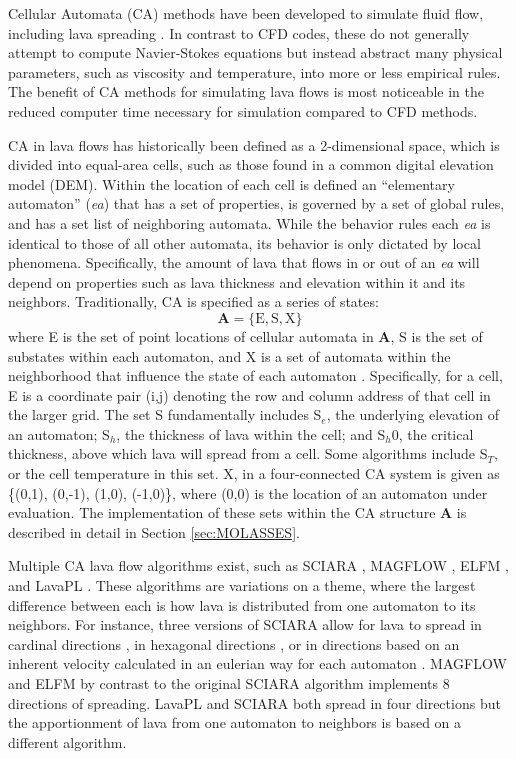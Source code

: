 \documentclass[12pt,letter]{article}
\begin{document}
	Cellular Automata (CA) methods have been developed to simulate fluid flow, including lava spreading \citep{barca1994cellular}. In contrast to CFD codes, these do not generally attempt to compute Navier-Stokes equations but instead abstract many physical parameters, such as viscosity and temperature, into more or less empirical rules. The benefit of CA methods for simulating lava flows is most noticeable in the reduced computer time necessary for simulation compared to CFD methods.

	CA in lava flows has historically been defined as a 2-dimensional space, which is divided into equal-area cells, such as those found in a common digital elevation model (DEM). Within the location of each cell is defined an ``elementary automaton'' (\textit{ea}) that has a set of properties, is governed by a set of global rules, and has a set list of neighboring automata. While the behavior rules each \textit{ea} is identical to those of all other automata, its behavior is only dictated by local phenomena. Specifically, the amount of lava that flows in or out of an \textit{ea} will depend on properties such as lava thickness and elevation within it and its neighbors. Traditionally, CA is specified as a series of states:
	\begin{equation}
		\mathbf{A} = \mathrm{\{E,S,X\}}
	\end{equation}
	where E is the set of point locations of cellular automata in \textbf{A}, S is the set of substates within each automaton, and X is a set of automata within the neighborhood that influence the state of each automaton \citep{barca1994cellular}. Specifically, for a cell, E is a coordinate pair (i,j) denoting the row and column address of that cell in the larger grid. The set S fundamentally includes S$_e$, the underlying elevation of an automaton; S$_h$, the thickness of lava within the cell; and S$_h0$, the critical thickness, above which lava will spread from a cell. Some algorithms include S$_T$, or the cell temperature in this set. X, in a four-connected CA system is given as \{(0,1), (0,-1), (1,0), (-1,0)\}, where (0,0) is the location of an automaton under evaluation. The implementation of these sets within the CA structure \textbf{A} is described in detail in Section \ref{sec:MOLASSES}.
	
	Multiple CA lava flow algorithms exist, such as SCIARA \citep{crisci2004simulation}, MAGFLOW \citep{del2008simulations}, ELFM \citep{damiani2006lava}, and LavaPL \citep{connor2012}. These algorithms are variations on a theme, where the largest difference between each is how lava is distributed from one automaton to its neighbors. For instance, three versions of SCIARA allow for lava to spread in cardinal directions \citep{barca1994cellular}, in hexagonal directions \citep{crisci2008lava}, or in directions based on an inherent velocity calculated in an eulerian way for each automaton \citep{avolio2006sciara}. MAGFLOW and ELFM by contrast to the original SCIARA algorithm implements 8 directions of spreading. LavaPL and SCIARA both spread in four directions but the apportionment of lava from one automaton to neighbors is based on a different algorithm.
\end{document}
